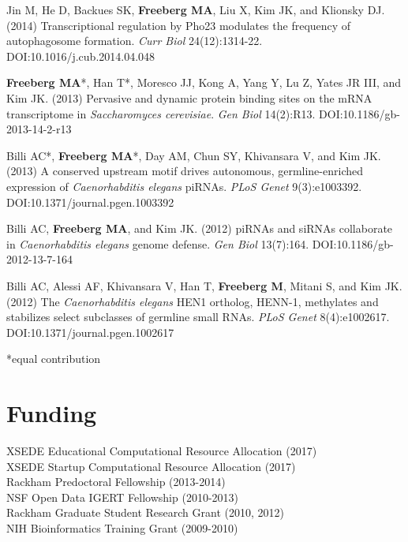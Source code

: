 \documentclass[margin,line]{res}
\begin{document}
\begin{resume}
Jin M, He D, Backues SK, {\bf Freeberg MA}, Liu X, Kim JK, and Klionsky DJ. (2014) Transcriptional regulation by Pho23 modulates the frequency of autophagosome formation. {\em Curr Biol} 24(12):1314-22. DOI:10.1016/j.cub.2014.04.048

{\bf Freeberg MA}*, Han T*, Moresco JJ, Kong A, Yang Y, Lu Z, Yates JR III, and Kim JK. (2013) Pervasive and dynamic protein binding sites on the mRNA transcriptome in {\em Saccharomyces cerevisiae}. {\em Gen Biol} 14(2):R13. DOI:10.1186/gb-2013-14-2-r13

Billi AC*, {\bf Freeberg MA}*, Day AM, Chun SY, Khivansara V, and Kim JK. (2013) A conserved upstream motif drives autonomous, germline-enriched expression of {\em Caenorhabditis elegans} piRNAs. {\em PLoS Genet} 9(3):e1003392. DOI:10.1371/journal.pgen.1003392

Billi AC, {\bf Freeberg MA}, and Kim JK. (2012) piRNAs and siRNAs collaborate in {\em Caenorhabditis elegans} genome defense. {\em Gen Biol} 13(7):164. DOI:10.1186/gb-2012-13-7-164

Billi AC, Alessi AF, Khivansara V, Han T, {\bf Freeberg M}, Mitani S, and Kim JK. (2012) The {\em Caenorhabditis elegans} HEN1 ortholog, HENN-1, methylates and stabilizes select subclasses of germline small RNAs. {\em PLoS Genet} 8(4):e1002617. DOI:10.1371/journal.pgen.1002617

*equal contribution

\section{\sc Funding} 
{XSEDE Educational Computational Resource Allocation (2017)}\\
{XSEDE Startup Computational Resource Allocation (2017)}\\
{Rackham Predoctoral Fellowship (2013-2014)}\\
{NSF Open Data IGERT Fellowship (2010-2013)}\\
{Rackham Graduate Student Research Grant (2010, 2012)}\\
{NIH Bioinformatics Training Grant (2009-2010)}\\



\end{resume}
\end{document}
